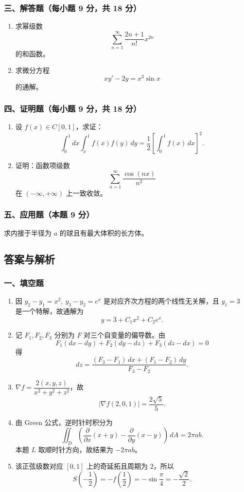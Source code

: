 \subsubsection*{三、解答题（每小题 9 分，共 18 分）}
\begin{enumerate}
  \item 求幂级数
  \[
  \sum_{n=1}^{\infty}\frac{2n+1}{n!}x^{2n}
  \]
  的和函数。
  \item 求微分方程
  \[
  xy'-2y=x^3\sin x
  \]
  的通解。
\end{enumerate}

\subsubsection*{四、证明题（每小题 9 分，共 18 分）}
\begin{enumerate}
  \item 设 $f(x)\in C[0,1]$，求证：
  \[
  \int_0^1 dx\int_x^1 f(x)f(y)\,dy=\frac12\left[\int_0^1 f(x)\,dx\right]^2.
  \]
  \item 证明：函数项级数
  \[
  \sum_{n=1}^{\infty}\frac{\cos(nx)}{n^2}
  \]
  在 $(-\infty,+\infty)$ 上一致收敛。
\end{enumerate}

\subsubsection*{五、应用题（本题 9 分）}
求内接于半径为 $a$ 的球且有最大体积的长方体。

\subsection{答案与解析}

\subsubsection*{一、填空题}
\begin{enumerate}
  \item 因 $y_2-y_1=x^2,\ y_3-y_2=e^x$ 是对应齐次方程的两个线性无关解，且 $y_1=3$ 是一个特解，故通解为
  \[
  y=3+C_1x^2+C_2e^x.
  \]
  \item 记 $F_1,F_2,F_3$ 分别为 $F$ 对三个自变量的偏导数。由
  \[
  F_1(dx-dy)+F_2(dy-dz)+F_3(dz-dx)=0
  \]
  得
  \[
  dz=\frac{(F_3-F_1)\,dx+(F_1-F_2)\,dy}{F_3-F_2}.
  \]
  \item $\nabla f=\dfrac{2(x,y,z)}{x^2+y^2+z^2}$，故
  \[
  |\nabla f(2,0,1)|=\frac{2\sqrt5}{5}.
  \]
  \item 由 Green 公式，逆时针时积分为
  \[
  \iint_D\left(\frac{\partial}{\partial x}(x+y)-\frac{\partial}{\partial y}(x-y)\right)\,dA
  =2\pi ab.
  \]
  本题 $L$ 取顺时针方向，故结果为 $-2\pi ab$。
  \item 该正弦级数对应 $[0,1]$ 上的奇延拓且周期为 $2$，所以
  \[
  S\!\left(-\frac12\right)=-f\!\left(\frac12\right)=-\sin\frac{\pi}{4}=-\frac{\sqrt2}{2}.
  \]
\end{enumerate}

